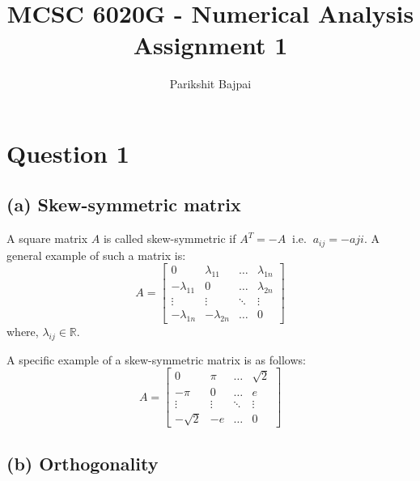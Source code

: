 \documentclass[11pt, oneside]{article}
\title{MCSC 6020G - Numerical Analysis \\
        \Large Assignment 1}
\author{Parikshit Bajpai}
\date{}
\begin{document}
\maketitle

\section*{Question 1}
\subsection*{(a) Skew-symmetric matrix}

  A square matrix $A$ is called skew-symmetric if $A^T = -A \;\; \text{i.e.} \;\; a_{ij}=-a{ji}$. A general example of such a matrix is:
  \begin{equation*}
      A=
      \begin{bmatrix}
        0              & \lambda_{11}  & \dots   & \lambda_{1n} \\
        -\lambda_{11}  & 0             & \dots   & \lambda_{2n} \\
        \vdots         & \vdots        & \ddots  & \vdots \\
        -\lambda_{1n}  & -\lambda_{2n} & \dots   & 0
      \end{bmatrix}
  \end{equation*}
  where, $\lambda_{ij} \in \mathbb{R}$.

  A specific example of a skew-symmetric matrix is as follows:
  \begin{equation*}
    A=
    \begin{bmatrix}
      0              & \pi         & \dots   & \sqrt{2} \\
      -\pi           & 0           & \dots   & e \\
      \vdots         & \vdots      & \ddots  & \vdots \\
      -\sqrt{2}      & -e          & \dots   & 0
    \end{bmatrix}
  \end{equation*}

\subsection*{(b) Orthogonality}
\end{document}
